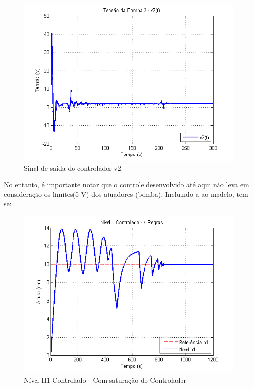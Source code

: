 \begin{figure}[H]
	\centering
	\includegraphics[height=0.35\paperheight, keepaspectratio]{img/nm_u2_free.png}
	\caption{Sinal de saída do controlador v2 }
	\label{figNm_u2_free}
\end{figure}

No entanto, é importante notar que o controle desenvolvido até aqui não leva em consideração os limites(5 V) dos atuadores (bomba). Incluindo-a ao modelo, tem-se:

\begin{figure}[H]
	\centering
	\includegraphics[height=0.35\paperheight, keepaspectratio]{img/nm_ctrl_h1ts2_ulim.png}
	\caption{\small Nível H1 Controlado - Com saturação do Controlador }
	\label{figH1TSCtrl2_ulim_nm}
\end{figure}

